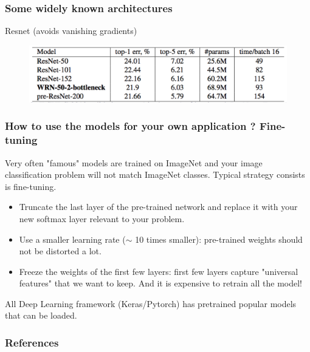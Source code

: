 \documentclass[french,9pt]{beamer}
\begin{document}

\begin{frame}
\frametitle{Some widely known architectures}

Resnet (avoids vanishing gradients) \cite{resnet,wide_resnet} 


\begin{figure}
  \begin{center}
    \includegraphics[width=1\textwidth]{fig/resnet.png}
  \end{center}
\end{figure}

\end{frame}



\begin{frame}
\frametitle{How to use the models for your own application ? Fine-tuning}

Very often "famous" models are trained on ImageNet and your image classification problem will not match ImageNet classes. Typical strategy consists is fine-tuning.

\pause 

\begin{itemize}
\item Truncate the last layer of the pre-trained network and replace it with your new softmax layer relevant to your problem.
\item Use a smaller learning rate ($\sim$ 10 times smaller): pre-trained weights should not be distorted a lot.
\item Freeze the weights of the first few layers: first few layers capture "universal features" that we want to keep. And it is expensive to retrain all the model!
\end{itemize}

\pause

All Deep Learning framework (Keras/Pytorch) has pretrained popular models that can be loaded.


\end{frame}



\begin{frame}[allowframebreaks]
        \frametitle{References}
        
        
\end{frame}
\end{document}
